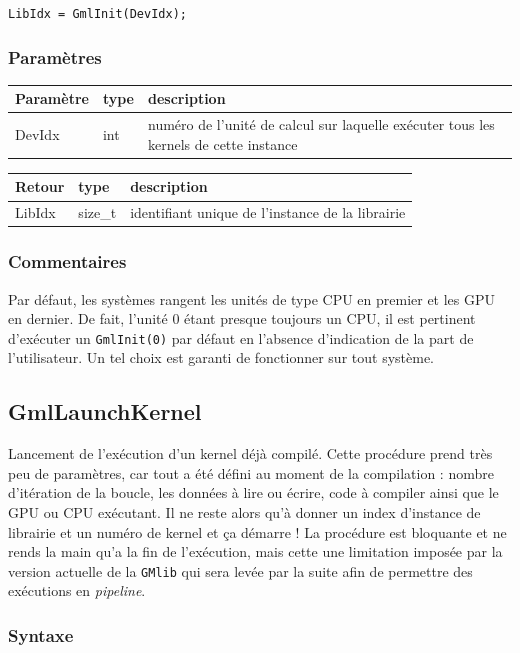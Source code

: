 \documentclass[a4paper,12pt]{article}
\begin{document}
{\tt LibIdx = GmlInit(DevIdx);}

\subsubsection*{Paramètres}

\begin{tabular}{|m{2cm}|m{1.5cm}|m{10.5cm}|}
\hline
Paramètre  & type   & description \\
\hline
DevIdx     & int    & numéro de l'unité de calcul sur laquelle exécuter tous les kernels de cette instance \\
\hline
\end{tabular}

\medskip

\begin{tabular}{|m{2cm}|m{1.5cm}|m{10.5cm}|}
\hline
Retour     & type    & description \\
\hline
LibIdx     & size\_t & identifiant unique de l'instance de la librairie \\
\hline
\end{tabular}

\subsubsection*{Commentaires}
Par défaut, les systèmes rangent les unités de type CPU en premier et les GPU en dernier.
De fait, l'unité 0 étant presque toujours un CPU, il est pertinent d'exécuter un {\tt GmlInit(0)} par défaut en l'absence d'indication de la part de l'utilisateur. Un tel choix est garanti de fonctionner sur tout système.


\subsection{GmlLaunchKernel}

Lancement de l'exécution d'un kernel déjà compilé.
Cette procédure prend très peu de paramètres, car tout a été défini au moment de la compilation : nombre d'itération de la boucle, les données à lire ou écrire, code à compiler ainsi que le GPU ou CPU exécutant.
Il ne reste alors qu'à donner un index d'instance de librairie et un numéro de kernel et ça démarre !
La procédure est bloquante et ne rends la main qu'a la fin de l'exécution, mais cette une limitation imposée par la version actuelle de la {\tt GMlib} qui sera levée par la suite afin de permettre des exécutions en \emph{pipeline}.

\subsubsection*{Syntaxe}
\end{document}
